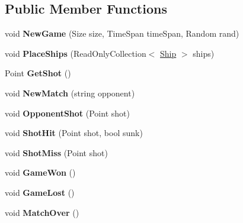 \subsection*{Public Member Functions}
\begin{DoxyCompactItemize}
\item 
\hypertarget{class_m_b_c_core_1_1_random_bot_a33f64a5d29910fba69ce286ad3aec122}{void {\bfseries New\-Game} (Size size, Time\-Span time\-Span, Random rand)}\label{class_m_b_c_core_1_1_random_bot_a33f64a5d29910fba69ce286ad3aec122}

\item 
\hypertarget{class_m_b_c_core_1_1_random_bot_a7200f1edb2f3357e47049cecf1b2e4d7}{void {\bfseries Place\-Ships} (Read\-Only\-Collection$<$ \hyperlink{class_m_b_c_core_1_1_ship}{Ship} $>$ ships)}\label{class_m_b_c_core_1_1_random_bot_a7200f1edb2f3357e47049cecf1b2e4d7}

\item 
\hypertarget{class_m_b_c_core_1_1_random_bot_a93fe42b8d5df68c77a607842914eb1aa}{Point {\bfseries Get\-Shot} ()}\label{class_m_b_c_core_1_1_random_bot_a93fe42b8d5df68c77a607842914eb1aa}

\item 
\hypertarget{class_m_b_c_core_1_1_random_bot_a5cced7ab9afbf3d172351bd1a7dc253a}{void {\bfseries New\-Match} (string opponent)}\label{class_m_b_c_core_1_1_random_bot_a5cced7ab9afbf3d172351bd1a7dc253a}

\item 
\hypertarget{class_m_b_c_core_1_1_random_bot_adaed621801a343d3371c7c6c7cd59ead}{void {\bfseries Opponent\-Shot} (Point shot)}\label{class_m_b_c_core_1_1_random_bot_adaed621801a343d3371c7c6c7cd59ead}

\item 
\hypertarget{class_m_b_c_core_1_1_random_bot_aa630a469cee2b5cf5e56a85af1eaf669}{void {\bfseries Shot\-Hit} (Point shot, bool sunk)}\label{class_m_b_c_core_1_1_random_bot_aa630a469cee2b5cf5e56a85af1eaf669}

\item 
\hypertarget{class_m_b_c_core_1_1_random_bot_a51524053a83a1db5ee5ea22d4686c781}{void {\bfseries Shot\-Miss} (Point shot)}\label{class_m_b_c_core_1_1_random_bot_a51524053a83a1db5ee5ea22d4686c781}

\item 
\hypertarget{class_m_b_c_core_1_1_random_bot_a2896c922de18fd6a2bd28c978d5acfde}{void {\bfseries Game\-Won} ()}\label{class_m_b_c_core_1_1_random_bot_a2896c922de18fd6a2bd28c978d5acfde}

\item 
\hypertarget{class_m_b_c_core_1_1_random_bot_af21db46ecb7c0644751da19f662129e2}{void {\bfseries Game\-Lost} ()}\label{class_m_b_c_core_1_1_random_bot_af21db46ecb7c0644751da19f662129e2}

\item 
\hypertarget{class_m_b_c_core_1_1_random_bot_a1bd09d9fd63a843c9d28dd7e941aea7b}{void {\bfseries Match\-Over} ()}\label{class_m_b_c_core_1_1_random_bot_a1bd09d9fd63a843c9d28dd7e941aea7b}

\end{DoxyCompactItemize}
